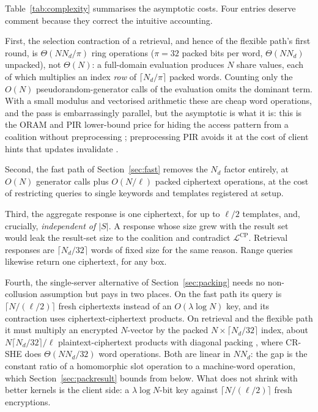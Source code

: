 \documentclass[a4paper,fleqn]{cas-sc}
\newcommand{\Leak}{\mathcal{L}}
\begin{document}
Table~\ref{tab:complexity} summarises the asymptotic costs. Four entries
deserve comment because they correct the intuitive accounting.

First, the selection contraction of a retrieval, and hence of the flexible
path's first round, is $\Theta(N N_d/\pi)$ ring
operations ($\pi=32$ packed bits per word, $\Theta(N N_d)$ unpacked), not $\Theta(N)$: a full-domain evaluation produces $N$ share
values, each of which multiplies an index \emph{row} of $\lceil N_d/\pi\rceil$ packed words. Counting
only the $O(N)$ pseudorandom-generator calls of the evaluation omits the
dominant term. With a small modulus and vectorised arithmetic these are cheap
word operations, and the pass is embarrassingly parallel, but the asymptotic
is what it is: this is the ORAM and PIR lower-bound price for hiding the
access pattern from a coalition without preprocessing
\citep{goldreich1996software,beimel2000reducing}; preprocessing PIR avoids it
at the cost of client hints that updates invalidate
\citep{corrigan2020private}.

Second, the fast path of Section~\ref{sec:fast} removes the $N_d$ factor
entirely, at $O(N)$ generator calls plus $O(N/\ell)$ packed ciphertext
operations, at the cost of restricting queries to single keywords and
templates registered at setup.

Third, the aggregate response is one ciphertext, for up to $\ell/2$ templates,
and, crucially, \emph{independent of $|S|$}. A response whose size grew with the result set
would leak the result-set size to the coalition and contradict
$\Leak^{\text{CP}}$. Retrieval responses are $\lceil N_d/32\rceil$ words of
fixed size for the same reason. Range queries likewise return one ciphertext,
for any box.

Fourth, the single-server alternative of Section~\ref{sec:packing} needs no
non-collusion assumption but pays in two places. On the fast path its query is
$\lceil N/(\ell/2)\rceil$ fresh ciphertexts instead of an $O(\lambda\log N)$
key, and its contraction uses ciphertext-ciphertext products. On retrieval and
the flexible path it must multiply an encrypted $N$-vector by the packed
$N\times\lceil N_d/32\rceil$ index, about $N\lceil N_d/32\rceil/\ell$
plaintext-ciphertext products with diagonal packing
\citep{halevi2014algorithms}, where CR-SHE does $\Theta(NN_d/32)$ word
operations. Both are linear in $NN_d$: the gap is the constant ratio of a
homomorphic slot operation to a machine-word operation, which
Section~\ref{sec:packresult} bounds from below. What does not shrink with
better kernels is the client side: a $\lambda\log N$-bit key against
$\lceil N/(\ell/2)\rceil$ fresh encryptions.
\end{document}

